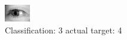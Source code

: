 \begin{figure}[h!]
\begin{center}
\includegraphics[width=0.60\columnwidth]{figures/ID3246_class_3_target_4.png}
\end{center}
\caption{ Classification: 3 actual target: 4}
\label{fig:ID3246_class_3_target_4}
\end{figure}
